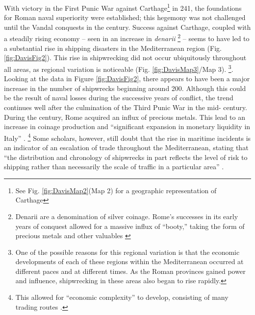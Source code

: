 With victory in the First Punic War against Carthage\footnote{See Fig. \ref{fig:DavisMap2}(Map 2) for a geographic representation of Carthage} in 241\BC, the foundations for Roman naval superiority were established; this hegemony was not challenged until the Vandal conquests in the  century\AD \parencite[8]{Scheidel_2009a}. 
Success against Carthage, coupled with a steadily rising economy – seen in an increase in \textit{denarii}
\footnote{Denarii are a denomination of silver coinage. Rome’s successes in its early years of conquest allowed for a massive influx of “booty,” taking the form of precious metals and other valuables \parencite{Kay_2014}}
\parencite[11]{Kay_2014} – seems to have led to a substantial rise in shipping disasters in the Mediterranean region (Fig. \ref{fig:DavisFig2}). This rise in shipwrecking did not occur ubiquitously throughout all areas, as regional variation is noticeable (Fig. \ref{fig:DavisMap3}/Map 3).
\footnote{One of the possible reasons for this regional variation is that the economic developments of each of these regions within the Mediterranean occurred at different paces and at different times. As the Roman provinces gained power and influence, shipwrecking in these areas also began to rise rapidly.}. 
Looking at the data in Figure \ref{fig:DavisFig2}, there appears to have been a major increase in the number of shipwrecks beginning around 200\BC. Although this could be the result of naval losses during the successive years of conflict, 
the trend continues well after the culmination of the Third Punic War in the mid- century\BC.  
During the  century, Rome acquired an influx of precious metals. 
This lead to an increase in coinage production and “significant expansion in monetary liquidity in Italy” \parencite[2]{Kay_2014}.
\footnote{This allowed for “economic complexity” to develop, consisting of many trading routes \parencite[2]{Kay_2014}.} 
Some scholars, however, still doubt that the rise in maritime incidents is an indicator of an escalation of trade throughout the Mediterranean, 
stating that “the distribution and chronology of shipwrecks in part reﬂects the level of risk to shipping rather than necessarily the scale of traffic in a particular area” \parencite[145]{Russell_2011}.



